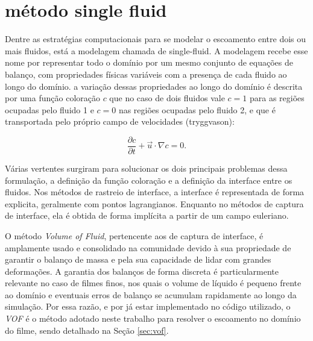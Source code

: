 \section{método single fluid}

Dentre as estratégias computacionais para se modelar o escoamento entre dois ou mais fluidos, está a modelagem chamada de single-fluid. A modelagem recebe esse nome por representar todo o domínio por um mesmo conjunto de equações de balanço, com propriedades físicas variáveis com a presença de cada fluido ao longo do domínio. a variação dessas propriedades ao longo do domínio é descrita por uma função coloração $c$ que no caso de dois fluidos vale $c = 1$ para as regiões ocupadas pelo fluido 1 e $c =0$ nas regiões ocupadas pelo fluido 2, e que é transportada pelo próprio campo de velocidades (tryggvason):

\begin{equation}
    \frac{\partial c}{\partial t} + \vec{u} \cdot \nabla c = 0.
    \label{eq:advection-vof}
\end{equation}

Várias vertentes surgiram para solucionar os dois principais problemas dessa formulação, a definição da função coloração e a definição da interface entre os fluidos. Nos métodos de rastreio de interface, a interface é representada de forma explicita, geralmente com pontos lagrangianos. Enquanto no métodos de captura de interface, ela é obtida de forma implícita a partir de um campo euleriano.

O método \textit{Volume of Fluid}, pertencente aos de captura de interface, é amplamente usado e consolidado na comunidade devido à sua propriedade de garantir o balanço de massa e pela sua capacidade de lidar com grandes deformações. A garantia dos balanços de forma discreta é particularmente relevante no caso de filmes finos, nos quais o volume de líquido é pequeno frente ao domínio e eventuais erros de balanço se acumulam rapidamente ao longo da simulação. Por essa razão, e por já estar implementado no código utilizado, o \textit{VOF} é o método adotado neste trabalho para resolver o escoamento no domínio do filme, sendo detalhado na Seção \ref{sec:vof}.

